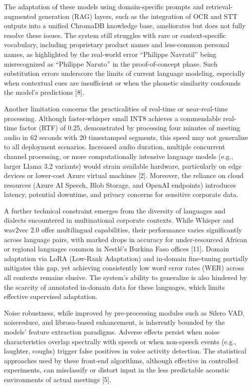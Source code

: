 \documentclass[12pt,a4paper]{article}
\begin{document}
The adaptation of these models using domain-specific prompts and retrieval-augmented generation (RAG) layers, such as the integration of OCR and STT outputs into a unified ChromaDB knowledge base, ameliorates but does not fully resolve these issues. The system still struggles with rare or context-specific vocabulary, including proprietary product names and less-common personal names, as highlighted by the real-world error “Philippe Navratil” being misrecognized as “Philippe Naruto” in the proof-of-concept phase. Such substitution errors underscore the limits of current language modeling, especially when contextual cues are insufficient or when the phonetic similarity confounds the model’s predictions [8].


Another limitation concerns the practicalities of real-time or near-real-time processing. Although faster-whisper small INT8 achieves a commendable real-time factor (RTF) of 0.25, demonstrated by processing four minutes of meeting audio in 62 seconds with 20 timestamped segments, this speed may not generalize to all deployment scenarios. Increased audio duration, multiple concurrent channel processing, or more computationally intensive language models (e.g., larger Llama 3.2 variants) would strain available hardware, particularly on edge devices or lower-cost Azure virtual machines [2]. Moreover, the reliance on cloud resources (Azure AI Speech, Blob Storage, and OpenAI endpoints) introduces latency, potential downtime, and privacy concerns for sensitive corporate data.


A further technical constraint emerges from the diversity of languages and dialects encountered in multinational corporate contexts. While Whisper and wav2vec 2.0 offer multilingual capabilities, their performance varies significantly across language pairs, with marked drops in accuracy for under-resourced African or regional languages common in Nestlé’s Burkina Faso offices [11]. Domain adaptation via LoRA (Low-Rank Adaptation) and in-domain fine-tuning partially mitigates this gap, yet achieving consistently low word error rates (WER) across all contexts remains elusive. The system’s ability to generalize is also hindered by the scarcity of annotated in-domain data for these languages, which limits effective supervised adaptation.


Noise robustness, while improved by pre-processing modules such as Silero VAD, noisereduce, and librosa-based enhancement, is inherently bounded by the models’ feature extraction paradigms. Adverse effects persist when noise characteristics overlap spectrally with speech or when non-speech events (e.g., laughter, coughs) trigger false positives in voice activity detection. The statistical approaches used by these front-end algorithms, although effective in controlled experiments, can misclassify or distort input in the less predictable acoustic environments of actual meetings [5].
\end{document}

